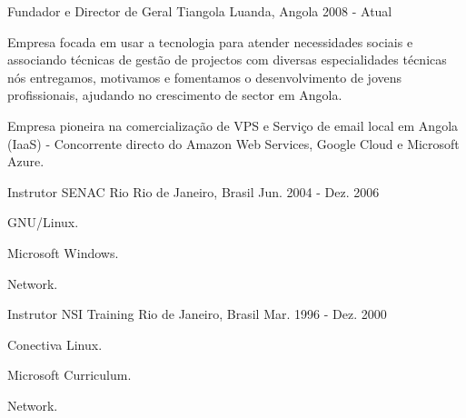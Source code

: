 \begin{cventries}
\cventry
{Fundador e Director de Geral} %
{Tiangola} %
{Luanda, Angola} %
{2008 - Atual} %
{ %
\begin{cvitems}
\item {Empresa focada em usar a tecnologia para atender necessidades sociais e associando técnicas de gestão de projectos com diversas especialidades técnicas nós entregamos, motivamos e fomentamos o desenvolvimento de jovens profissionais, ajudando no crescimento de sector em Angola.}
\item {Empresa pioneira na comercialização de VPS e Serviço de email local em Angola (IaaS) - Concorrente directo do Amazon Web Services, Google Cloud e Microsoft Azure.}
\end{cvitems}
}


\cventry
{Instrutor} %
{SENAC Rio} %
{Rio de Janeiro, Brasil} %
{Jun. 2004 - Dez. 2006} %
{ %
\begin{cvitems}
\item {GNU/Linux.}
\item {Microsoft Windows.}
\item {Network.}
\end{cvitems}
}


\cventry
{Instrutor} %
{NSI Training} %
{Rio de Janeiro, Brasil} %
{Mar. 1996 - Dez. 2000} %
{ %
\begin{cvitems}
\item {Conectiva Linux.}
\item {Microsoft Curriculum.}
\item {Network.}
\end{cvitems}
}



\end{cventries}
